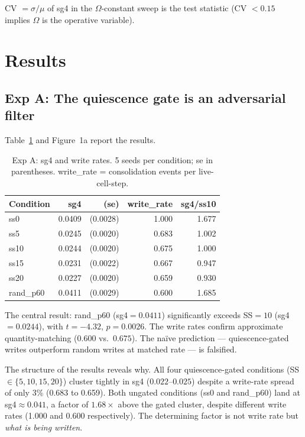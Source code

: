 \documentclass[11pt,a4paper]{article}
\begin{document}
CV $= \sigma/\mu$ of sg4 in the $\Omega$-constant sweep is the test statistic
(CV $< 0.15$ implies $\Omega$ is the operative variable).

\section{Results}

\subsection{Exp A: The quiescence gate is an adversarial filter}

Table~\ref{tab:exp_a} and Figure~1a report the results.

\begin{table}[h]
\centering
\caption{Exp A: sg4 and write rates.
  5 seeds per condition; se in parentheses.
  write\_rate = consolidation events per live-cell-step.}
\label{tab:exp_a}
\begin{tabular}{lrrrr}
\toprule
Condition & sg4 & (se) & write\_rate & sg4/ss10 \\
\midrule
ss0       & 0.0409 & (0.0028) & 1.000 & 1.677 \\
ss5       & 0.0245 & (0.0020) & 0.683 & 1.002 \\
ss10      & 0.0244 & (0.0020) & 0.675 & 1.000 \\
ss15      & 0.0231 & (0.0022) & 0.667 & 0.947 \\
ss20      & 0.0227 & (0.0020) & 0.659 & 0.930 \\
rand\_p60 & 0.0411 & (0.0029) & 0.600 & 1.685 \\
\bottomrule
\end{tabular}
\end{table}

The central result: rand\_p60 (sg4$=0.0411$) significantly exceeds SS$=10$ (sg4$=0.0244$),
with $t=-4.32$, $p=0.0026$.
The write rates confirm approximate quantity-matching ($0.600$ vs.\ $0.675$).
The na\"ive prediction --- quiescence-gated writes outperform random writes
at matched rate --- is falsified.

The structure of the results reveals why.
All four quiescence-gated conditions (SS$\in\{5,10,15,20\}$) cluster tightly
in sg4 ($0.022$--$0.025$) despite a write-rate spread of only 3\%
(0.683 to 0.659).
Both ungated conditions (ss0 and rand\_p60) land at sg4$\approx0.041$, a factor
of $1.68\times$ above the gated cluster, despite different write rates
(1.000 and 0.600 respectively).
The determining factor is not write rate but \emph{what is being written}.
\end{document}
